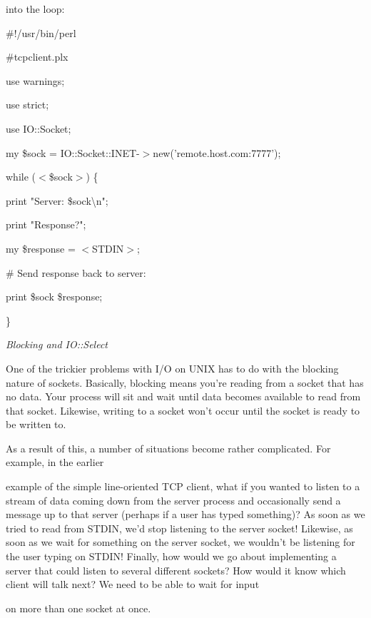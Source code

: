 \documentclass[a4paper,11pt]{book}
\begin{document}
\noindent into the loop:

\noindent 

\noindent \#!/usr/bin/perl

\noindent \#tcpclient.plx

\noindent use warnings;

\noindent use strict;

\noindent use IO::Socket;

\noindent 

\noindent my \$sock = IO::Socket::INET-$>$new('remote.host.com:7777');

\noindent while ($<$\$sock$>$) \{

\noindent print "Server: \$sock\textbackslash n";

\noindent print "Response?";

\noindent my \$response = $<$STDIN$>$;

\noindent \# Send response back to server:

\noindent print \$sock \$response;

\noindent \}

\noindent 

\noindent \textit{Blocking and IO::Select}

\noindent One of the trickier problems with I/O on UNIX has to do with the blocking nature of sockets. Basically, blocking means you're reading from a socket that has no data. Your process will sit and wait until data becomes available to read from that socket. Likewise, writing to a socket won't occur until the socket is ready to be written to.

\noindent 

\noindent As a result of this, a number of situations become rather complicated. For example, in the earlier

\noindent example of the simple line-oriented TCP client, what if you wanted to listen to a stream of data coming down from the server process and occasionally send a message up to that server (perhaps if a user has typed something)? As soon as we tried to read from STDIN, we'd stop listening to the server socket! Likewise, as soon as we wait for something on the server socket, we wouldn't be listening for the user typing on STDIN! Finally, how would we go about implementing a server that could listen to several different sockets? How would it know which client will talk next? We need to be able to wait for input

\noindent on more than one socket at once.
\end{document}

